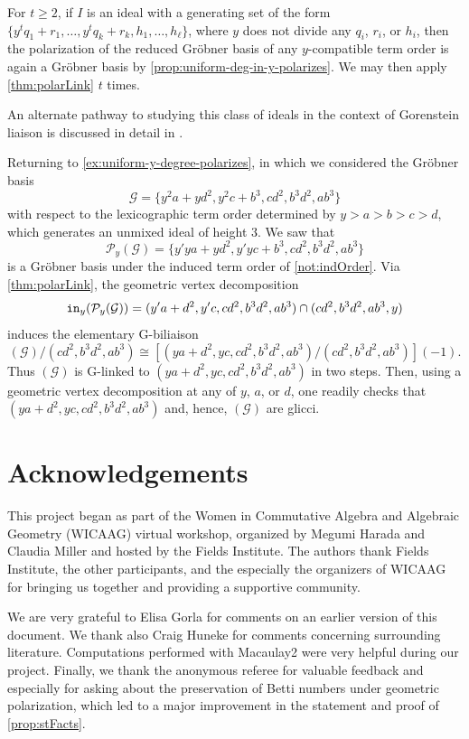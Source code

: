 \documentclass[12pt, reqno]{amsart}
\numberwithin{equation}{section}
\newtheorem{Main Conjecture}[theorem]{Main Conjecture}
\theoremstyle{definition}
\newenvironment{example}
  {\pushQED{\qed}\renewcommand{\qedsymbol}{$\diamondsuit$}\examplex}
  {\popQED\endexamplex}
\theoremstyle{plain}
\newcommand{\init}{{\tt in}}
\newcommand{\G}{\mathcal{G}}
\renewcommand{\P}{\mathcal{P}}
\begin{document}
    \begin{example}
        For $t \geq 2$, if $I$ is an ideal with a generating set of the form $\{y^t q_1+r_1, \ldots, y^t q_k+r_k, h_1, \ldots, h_\ell\}$, where $y$ does not divide any $q_i$, $r_i$, or $h_i$, then the polarization of the reduced Gr\"obner basis of any $y$-compatible term order is again a Gr\"obner basis by \cref{prop:uniform-deg-in-y-polarizes}.  We may then apply \cref{thm:polarLink} $t$ times. 

        An alternate pathway to studying this class of ideals in the context of Gorenstein liaison is discussed in detail in \cite{CD}.

        Returning to \cref{ex:uniform-y-degree-polarizes}, in which we considered the Gr\"obner basis \[
        \G = \{y^2a+yd^2, y^2c+b^3, cd^2,b^3d^2,ab^3\}
        \] with respect to the lexicographic term order determined by $y>a>b>c>d$, which generates an unmixed ideal of height $3$. We saw that  
    \[
   \P_y(\G) =  \{y'ya+yd^2, y'yc+b^3, cd^2, b^3d^2, ab^3 \}
    \] is  a Gr\"obner basis under the induced term order of \cref{not:indOrder}. Via \cref{thm:polarLink}, the geometric vertex decomposition \[
 \init_y(\P_y(\G)) = (y'a+d^2, y'c, cd^2, b^3d^2, ab^3) \cap (cd^2, b^3d^2, ab^3, y) 
    \] induces the elementary G-biliaison \[
    (\G)/(cd^2, b^3d^2, ab^3) \cong [(ya+d^2, yc, cd^2, b^3d^2, ab^3)/(cd^2, b^3d^2, ab^3)](-1).
    \] Thus $(\G)$ is G-linked to $(ya+d^2, yc, cd^2, b^3d^2, ab^3)$ in two steps. Then, using a geometric vertex decomposition at any of $y$, $a$, or $d$, one readily checks that $(ya+d^2, yc, cd^2, b^3d^2, ab^3)$ and, hence, $(\G)$ are glicci.
    \end{example}




\section{Acknowledgements}
 This project began as part of the Women in Commutative Algebra and Algebraic Geometry (WICAAG) virtual workshop, organized by Megumi Harada and Claudia Miller and hosted by the Fields Institute.  The authors thank Fields Institute, the other participants, and the especially the organizers of WICAAG for bringing us together and providing a supportive community. 

 We are very grateful to Elisa Gorla for comments on an earlier version of this document. We thank also Craig Huneke for comments concerning surrounding literature.  Computations performed with Macaulay2 \cite{M2} were very helpful during our project. Finally, we thank the anonymous referee for valuable feedback and especially for asking about the preservation of Betti numbers under geometric polarization, which led to a major improvement in the statement and proof of \cref{prop:stFacts}.












\end{document}
